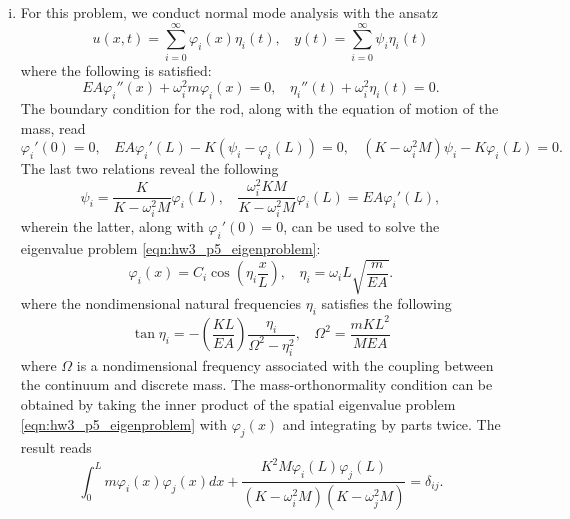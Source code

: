 \begin{enumerate}[(i)]
\item {
    For this problem, we conduct normal mode analysis with the ansatz 
    \begin{equation}
        u(x, t) = \sum_{i=0}^\infty \varphi_i(x) \eta_i(t), ~~~~ y(t) = \sum_{i=0}^\infty \psi_i \eta_i(t)
    \end{equation}
    where the following is satisfied:
    \begin{equation}\label{eqn:hw3_p5_eigenproblem}
        EA \varphi_i''(x) + \omega_i^2 m \varphi_i(x) = 0, ~~~~ \eta_i''(t) + \omega_i^2 \eta_i(t) = 0.
    \end{equation}
    The boundary condition for the rod, along with the equation of motion of the mass, read 
    \begin{equation}\label{eqn:hw3_p5_bc_1}
        \varphi_i'(0) = 0, ~~~~ EA \varphi_i'(L) - K(\psi_i - \varphi_i(L)) = 0, ~~~~ (K - \omega_i^2 M) \psi_i - K\varphi_i(L) = 0.
    \end{equation}
    The last two relations reveal the following
    \begin{equation}\label{eqn:hw3_p5_bc_2}
        \psi_i = \frac{K}{K - \omega_i^2 M} \varphi_i(L), ~~~~ \frac{\omega_i^2 KM}{K - \omega_i^2 M} \varphi_i(L) = EA \varphi_i'(L),
    \end{equation}
    wherein the latter, along with $\varphi_i'(0) = 0$, can be used to solve the eigenvalue problem \cref{eqn:hw3_p5_eigenproblem}:
    \begin{equation}\label{eqn:hw3_p5_eigenfunction}
        \boxed{\varphi_i(x) = C_i \cos\left(\eta_i \frac{x}{L}\right), ~~~~ \eta_i = \omega_i L \sqrt{\frac{m}{EA}}}.
    \end{equation}
    where the nondimensional natural frequencies $\eta_i$ satisfies the following 
    \begin{equation}\label{eqn:hw3_p5_eval_eqn}
        \tan \eta_i = - \left(\frac{KL}{EA}\right) \frac{\eta_i}{\Omega^2 - \eta_i^2}, ~~~~ \Omega^2 = \frac{mKL^2}{MEA}
    \end{equation}
    where $\Omega$ is a nondimensional frequency associated with the coupling between the continuum and discrete mass. 
    The mass-orthonormality condition can be obtained by taking the inner product of the spatial eigenvalue problem \cref{eqn:hw3_p5_eigenproblem} with $\varphi_j(x)$ and integrating by parts twice. 
    The result reads 
    \begin{equation}\label{eqn:hw3_p5_mass_orthonormality}
        \int_0^L m \varphi_i(x) \varphi_j(x) dx + \frac{K^2M \varphi_i(L) \varphi_j(L)}{(K - \omega_i^2 M)(K - \omega_j^2 M)} = \delta_{ij}.
    \end{equation}   
    
}
\end{enumerate}
